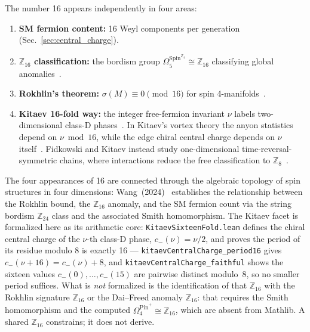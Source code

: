 \documentclass[aps,prl,twocolumn,superscriptaddress]{revtex4-2}
\begin{document}
The number 16 appears independently in four areas:
\begin{enumerate}
\item \textbf{SM fermion content:} 16 Weyl components per generation
(Sec.~\ref{sec:central_charge}).
\item \textbf{$\mathbb{Z}_{16}$ classification:} the bordism group
$\Omega_5^{\mathrm{Spin}^{\mathbb{Z}_4}} \cong \mathbb{Z}_{16}$ classifying
global anomalies~\cite{GarciaEtxebarria2019}.
\item \textbf{Rokhlin's theorem:} $\sigma(M) \equiv 0 \pmod{16}$ for spin
4-manifolds~\cite{Rokhlin1952}.
\item \textbf{Kitaev 16-fold way:} the integer free-fermion invariant
$\nu$ labels two-dimensional class-D phases~\cite{Kitaev2009}.
In Kitaev's vortex theory the anyon statistics depend on
$\nu \bmod 16$, while the edge chiral central charge depends on
$\nu$ itself~\cite{KitaevHonest2006}.
Fidkowski and Kitaev instead study one-dimensional
time-reversal-symmetric chains, where interactions reduce the free
classification to $\mathbb{Z}_8$~\cite{FidkowskiKitaev2010}.
\end{enumerate}
The four appearances of 16 are connected through the algebraic topology
of spin structures in four dimensions: Wang~(2024)~\cite{Wang2024}
establishes the relationship between the Rokhlin bound, the
$\mathbb{Z}_{16}$ anomaly, and the SM fermion count via the string
bordism $\mathbb{Z}_{24}$ class and the associated Smith homomorphism.
The Kitaev facet is formalized here as its arithmetic core:
\texttt{KitaevSixteenFold.lean} defines the chiral central charge of the
$\nu$-th class-D phase, $c_-(\nu) = \nu/2$, and proves the period
of its residue modulo 8 is exactly 16 --- \texttt{kitaevCentralCharge\_period16} gives
$c_-(\nu+16) = c_-(\nu) + 8$, and
\texttt{kitaevCentralCharge\_faithful} shows the sixteen values
$c_-(0),\ldots,c_-(15)$ are pairwise distinct modulo~8, so no smaller
period suffices. What is \emph{not} formalized is the identification of
that $\mathbb{Z}_{16}$ with the Rokhlin signature $\mathbb{Z}_{16}$ or
the Dai--Freed anomaly $\mathbb{Z}_{16}$: that requires the Smith
homomorphism and the computed
$\Omega_4^{\mathrm{Pin}^+} \cong \mathbb{Z}_{16}$, which are absent from
Mathlib. A shared $\mathbb{Z}_{16}$ constrains; it does not derive.
\end{document}
